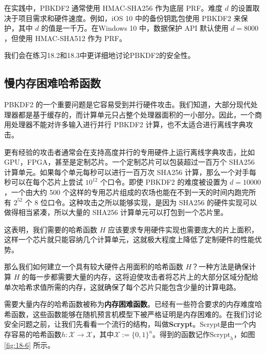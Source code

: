 在实践中，PBKDF2 通常使用 HMAC-SHA256 作为底层 PRF。难度 $d$ 的设置取决于项目需求和硬件速度。例如，iOS 10 中的备份钥匙包使用 PBKDF2 来保护，其中 $d$ 的值是一千万。在Windows 10 中，数据保护 API 默认使用 $d = 8000$，但使用 HMAC-SHA512 作为 PRF。

我们会在练习18.2和18.3中更详细地讨论PBKDF2的安全性。

\subsection{慢内存困难哈希函数}

PBKDF2 的一个重要问题是它容易受到并行硬件攻击。我们知道，大部分现代处理器都是基于缓存的，而计算单元只占整个处理器面积的一小部分。因此，一个商用处理器不能对许多输入进行并行 PBKDF2 计算，也不太适合进行离线字典攻击。

更有经验的攻击者通常会在支持高度并行的专用硬件上运行离线字典攻击，比如 GPU，FPGA，甚至是定制芯片。一个定制芯片可以包装超过一百万个 SHA256 计算单元。如果每个单元每秒可以进行一百万次 SHA256 计算，那么一个对手每秒可以在每个芯片上尝试 $10^{12}$ 个口令。即使 PBKDF2 的难度被设置为 $d=10000$，一个由大约 500 个这样的专用芯片组成的农场也能在不到一天的时间内跑完所有 $2^{52}$ 个 8 位口令。这种攻击之所以能够实现，是因为 SHA256 的硬件实现可以做得相当紧凑，所以大量的 SHA256 计算单元可以打包到一个芯片里。

这表明，我们需要的哈希函数 $H$ 应该要求专用硬件实现也需要庞大的片上面积，这样一个芯片就只能容纳几个计算单元，这就极大程度上降低了定制硬件的性能优势。

那么我们如何建立一个具有较大硬件占用面积的哈希函数 $H$？一种方法是确保计算 $H$ 的每一步都需要大量的内存，这将迫使攻击者将芯片上的大部分区域分配给单次哈希求值所需的内存，这就确保了每个芯片只能包含少量的计算电路。

需要大量内存的哈希函数被称为\textbf{内存困难函数}。已经有一些符合要求的内存难度哈希函数，这些函数能够在随机预言机模型下被严格证明是内存困难的。在我们讨论安全问题之前，让我们先看看一个流行的结构，叫做\textbf{Scrypt}。Scrypt是由一个内存容易的哈希函数$h:\mathcal{X}\rightarrow\mathcal{X}$，其中$\mathcal{X}:=\{0,1\}^n$。得到的函数记作$\text{Scrypt}_h$，如图 \ref{fig:18-6} 所示。


